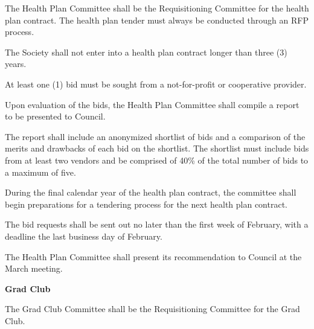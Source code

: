 \begin{longenum}[label*=\thesection.\arabic*., align=left]
\begin{longenum} [label*=\arabic*., align=left]
		\begin{longenum} [label*=\arabic*., align=left]
			\item The Health Plan Committee shall be the Requisitioning Committee for the health plan contract. The health plan tender must always be conducted through an RFP process.
		\item 	The Society shall not enter into a health plan contract longer than three (3) years.
		\item 	At least one (1) bid must be sought from a not-for-profit or cooperative provider.
		\item Upon evaluation of the bids, the Health Plan Committee shall compile a report to be presented to Council.
		\item The  report  shall  include  an  anonymized  shortlist  of  bids  and  a  comparison  of  the  merits  and  drawbacks  of  each  bid  on  the  shortlist.  The  shortlist  must  include  bids  from  at  least  two  vendors  and  be  comprised  of  40\%  of  the  total  number  of  bids  to  a  maximum  of  five.
		\item During the final calendar year of the health plan contract, the committee shall begin preparations for a tendering process for the next health plan contract.
		\item 	The bid requests shall be sent out no later than the first week of February, with a deadline the last business day of February.
		\item 	The Health Plan Committee shall present its recommendation to Council at the
March meeting.
	\end{longenum}	
	
\item \textbf{Grad Club}

\begin{longenum} [label*=\arabic*., align=left]
	\item The Grad Club Committee shall be the Requisitioning Committee for the Grad Club.
\end{longenum}	


\end{longenum}

\end{longenum}

